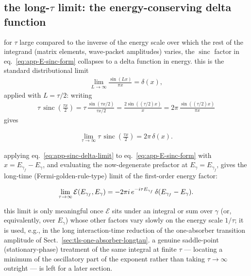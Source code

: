 \subsection{ the long-$\tau$ limit: the energy-conserving delta function}\label{sec:app-first-order-delta-limit}

for $\tau$ large compared to the inverse of the energy scale over which the rest of the integrand (matrix elements, wave-packet amplitudes) varies, the $\operatorname{sinc}$ factor in eq.~\eqref{eq:app-E-sinc-form} collapses to a delta function in energy. this is the standard distributional limit
\begin{align}
  \lim_{L\to\infty}\frac{\sin(Lx)}{\pi x} = \delta(x),
\end{align}
applied with $L=\tau/2$: writing
\begin{align}
  \tau\,\operatorname{sinc}\!\left(\frac{\tau x}{2}\right) = \tau\,\frac{\sin(\tau x/2)}{\tau x/2} = \frac{2\sin\left((\tau/2)x\right)}{x} = 2\pi\,\frac{\sin\left((\tau/2)x\right)}{\pi x}
\end{align}
gives
\begin{importantbox}
  \begin{align}
    \lim_{\tau\to\infty}\tau\,\operatorname{sinc}\!\left(\frac{\tau x}{2}\right) = 2\pi\,\delta(x).\label{eq:app-sinc-delta-limit}
  \end{align}
\end{importantbox}
applying eq.~\eqref{eq:app-sinc-delta-limit} to eq.~\eqref{eq:app-E-sinc-form} with $x=E_{\gamma_f}-E_\gamma$, and evaluating the now-degenerate prefactor at $E_\gamma=E_{\gamma_f}$, gives the long-time (Fermi-golden-rule-type) limit of the first-order energy factor:
\begin{importantbox}
  \begin{align}
    \lim_{\tau\to\infty}{\cal E}(E_{\gamma_f},E_\gamma) = -2\pi i\, e^{-i\tau E_{\gamma_f}}\,\delta(E_{\gamma_f}-E_\gamma).\label{eq:app-first-order-delta-limit}
  \end{align}
\end{importantbox}
this limit is only meaningful once $\mathcal E$ sits under an integral or sum over $\gamma$ (or, equivalently, over $E_\gamma$) whose other factors vary slowly on the energy scale $1/\tau$; it is used, e.g., in the long interaction-time reduction of the one-absorber transition amplitude of Sect.~\ref{sec:tls-one-absorber-longtau}. a genuine saddle-point (stationary-phase) treatment of the same integral at finite $\tau$ --- locating a minimum of the oscillatory part of the exponent rather than taking $\tau\to\infty$ outright --- is left for a later section.

